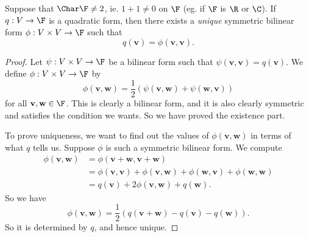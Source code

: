\documentclass[a4paper]{article}
\begin{document}
\begin{prop}
  Suppose that $\Char \F \not= 2$, ie. $1 + 1 \not= 0$ on $\F$ (eg. if $\F$ is $\R$ or $\C$). If $q: V\to \F$ is a quadratic form, then there exists a \emph{unique} symmetric bilinear form $\phi: V \times V\to \F$ such that
  \[
    q(\mathbf{v}) = \phi(\mathbf{v}, \mathbf{v}).
  \]
\end{prop}

\begin{proof}
  Let $\psi: V \times V\to \F$ be a bilinear form such that $\psi(\mathbf{v}, \mathbf{v}) = q(\mathbf{v})$. We define $\phi: V \times V\to \F$ by
  \[
    \phi(\mathbf{v}, \mathbf{w}) = \frac{1}{2}(\psi(\mathbf{v}, \mathbf{w}) + \psi(\mathbf{w}, \mathbf{v}))
  \]
  for all $\mathbf{v}, \mathbf{w} \in \F$. This is clearly a bilinear form, and it is also clearly symmetric and satisfies the condition we wants. So we have proved the existence part.

  To prove uniqueness, we want to find out the values of $\phi(\mathbf{v}, \mathbf{w})$ in terms of what $q$ tells us. Suppose $\phi$ is such a symmetric bilinear form. We compute
  \begin{align*}
    \phi(\mathbf{v}, \mathbf{w}) &= \phi(\mathbf{v} + \mathbf{w}, \mathbf{v} + \mathbf{w}) \\
    &= \phi(\mathbf{v}, \mathbf{v}) + \phi(\mathbf{v}, \mathbf{w}) + \phi(\mathbf{w}, \mathbf{v}) + \phi(\mathbf{w}, \mathbf{w})\\
    &= q(\mathbf{v}) + 2\phi(\mathbf{v}, \mathbf{w}) + q(\mathbf{w}).
  \end{align*}
  So we have
  \[
    \phi(\mathbf{v}, \mathbf{w}) = \frac{1}{2}(q(\mathbf{v} + \mathbf{w}) - q(\mathbf{v}) - q(\mathbf{w})).
  \]
  So it is determined by $q$, and hence unique.
\end{proof}
\end{document}
